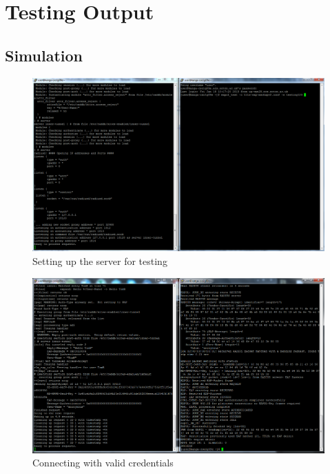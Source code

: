 \documentclass[12pt,a4paper,titlepage]{article}
\begin{document}
\newpage
\section{Testing Output}

\subsection{Simulation}
\label{sec:testing-output;sub:simulation}
\begin{figure}[h!]
\centering
\includegraphics[scale=0.3]{./images/simulation/test1.png}
\caption{Setting up the server for testing}
\end{figure}

\begin{figure}[h!]
\centering
\includegraphics[scale=0.3]{./images/simulation/test2.png}
\caption{Connecting with valid credentials}
\end{figure}
\end{document}
